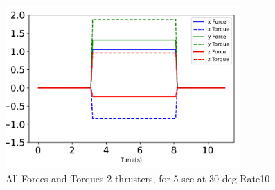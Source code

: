 \begin{figure}[htbp]\centerline{\includegraphics[width=0.8\textwidth]{AutoTeX/2Thrusters_5s_30deg_Loc2_Rate10}}\caption{All Forces and Torques 2 thrusters, for 5 sec at 30 deg Rate10}\label{fig:2Thrusters_5s_30deg_Loc2_Rate10}\end{figure}